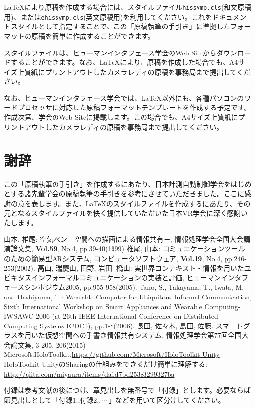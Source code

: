\documentclass{hissymp}
\begin{document}
\LaTeX{}\cite{tex1,tex2}により原稿を作成する場合には、スタイルファイル{\tt hissymp.cls}(和文原稿用)、または{\tt ehissymp.cls}(英文原稿用)を利用してください。これをドキュメントスタイルとして指定することで、この「原稿執筆の手引き」に準拠したフォーマットの原稿を簡単に作成することができます。

スタイルファイルは、ヒューマンインタフェース学会のWeb Siteからダウンロードすることができます。なお、\LaTeX{}により、原稿を作成した場合でも、A4サイズ上質紙にプリントアウトしたカメラレディの原稿を事務局まで提出してください。

なお、ヒューマンインタフェース学会では、\LaTeX{}以外にも、各種パソコンのワードプロセッサに対応した原稿フォーマットテンプレートを作成する予定です。作成次第、学会のWeb Siteに掲載します。この場合でも、A4サイズ上質紙にプリントアウトしたカメラレディの原稿を事務局まで提出してください。



\section*{謝辞}
この「原稿執筆の手引き」を作成するにあたり、日本計測自動制御学会をはじめとする諸先輩学会の原稿執筆の手引きを参考にさせていただきました。ここに感謝の意を表します。また、\LaTeX{}のスタイルファイルを作成するにあたり、その元となるスタイルファイルを快く提供していただいた日本VR学会に深く感謝いたします。

\begin{thebibliography}{99}
        山本, 椎尾:
        空気ペン―空間への描画による情報共有－,
        情報処理学会全国大会講演論文集,
        {\bf Vol.59}, No.4, pp.39-40(1999)
	椎尾, 山本:
	コミュニケーションツールのための簡易型ARシステム,
	コンピュータソフトウェア, 
        {\bf Vol.19}, No.4, pp.246-253(2002).
	高山, 瑞慶山, 田野, 岩田, 橋山:
	実世界コンテキスト・情報を用いたユビキタスインフォーマルコミュニケーションの実装と評価,
	ヒューマンインタフェースシンポジウム2005,
        pp.955-958(2005).
        Tano, S., Takayama, T., Iwata, M. and Hashiyama, T.:
        Wearable Computer for Ubiquitous Informal Communication,
        Sixth International Workshop on Smart Appliances and Wearable Computing-IWSAWC 2006-(at 26th IEEE International Conference on Distributed Computing Systems ICDCS),
        pp.1-8(2006).
        長田, 佐々木, 島田, 佐藤:
        スマートグラスを用いた仮想空間への手書き情報共有システム,
        情報処理学会第77回全国大会論文集,
        3-205, 206(2015)
        Microsoft:HoloToolkit,\url{https://github.com/Microsoft/HoloToolkit-Unity}
        HoloToolkit-UnityのSharingの仕組みをできるだけ簡単に理解する: 
        \url{http://qiita.com/miyaura/items/da1d7bd253c3299327ba}

\end{thebibliography}


\appendix{}
付録は参考文献の後につけ、章見出しを無番号で「付録」とします。必要ならば節見出しとして「付録1.,付録2.,\,$ \cdots $\,」などを用いて区分けしてください。
\end{document}
